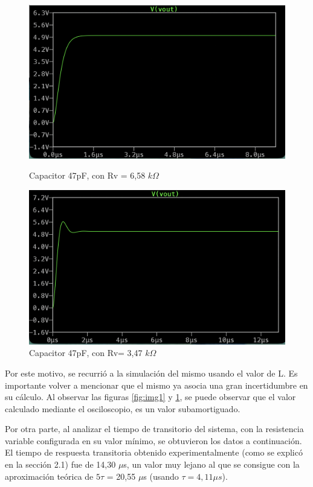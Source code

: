 \documentclass{article}
\begin{document}
        \begin{figure}[h!]
    \centering
    \begin{minipage}{0.49\textwidth}
        \centering
        \includegraphics[width=\linewidth]{CRIT2.png}
        \caption{Capacitor 47pF, con Rv = 6,58 $k\Omega$}
        \label{fig:img1}
    \end{minipage}\hfill
    \begin{minipage}{0.49\textwidth}
        \centering
        \includegraphics[width=\linewidth]{SUBAMORT1.png}
        \caption{Capacitor 47pF, con Rv= 3,47 $k\Omega$}
        \label{fig:img2}
    \end{minipage}
\end{figure}

        Por este motivo, se recurrió a la simulación del mismo usando el valor de L. Es importante volver a mencionar que el mismo ya asocia una gran incertidumbre en su cálculo. Al observar las figuras \ref{fig:img1} y \ref{fig:img2}, se puede observar que el valor calculado mediante el osciloscopio, es un valor subamortiguado. \par
        Por otra parte, al analizar el tiempo de transitorio del sistema, con la resistencia variable configurada en su valor mínimo, se obtuvieron los datos a continuación. El tiempo de respuesta transitoria obtenido experimentalmente (como se explicó en la sección 2.1) fue de 14,30 $\mu$s, un valor muy lejano al que se consigue con la aproximación teórica de $5\tau$ = 20,55 $\mu$s (usando $\tau = 4,11 \mu s$). \par
        
\end{document}
